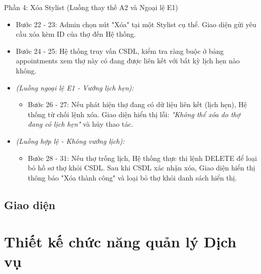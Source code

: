 \documentclass[../BTL.tex]{subfiles}
\begin{document}
Phần 4: Xóa Stylist (Luồng thay thế A2 và Ngoại lệ E1)

\begin{itemize}
\item
  Bước 22 - 23: Admin chọn nút "Xóa" tại một Stylist cụ thể. Giao diện
  gửi yêu cầu xóa kèm ID của thợ đến Hệ thống.
\item
  Bước 24 - 25: Hệ thống truy vấn CSDL, kiểm tra ràng buộc ở bảng
  appointments xem thợ này có đang được liên kết với bất kỳ lịch hẹn nào
  không.
\item
  \emph{(Luồng ngoại lệ E1 - Vướng lịch hẹn):}

  \begin{itemize}
  \item
    Bước 26 - 27: Nếu phát hiện thợ đang có dữ liệu liên kết (lịch hẹn),
    Hệ thống từ chối lệnh xóa. Giao diện hiển thị lỗi: \emph{"Không thể
    xóa do thợ đang có lịch hẹn"} và hủy thao tác.
  \end{itemize}
\item
  \emph{(Luồng hợp lệ - Không vướng lịch):}

  \begin{itemize}
  \item
    Bước 28 - 31: Nếu thợ trống lịch, Hệ thống thực thi lệnh DELETE để
    loại bỏ hồ sơ thợ khỏi CSDL. Sau khi CSDL xác nhận xóa, Giao diện
    hiển thị thông báo "Xóa thành công" và loại bỏ thợ khỏi danh sách
    hiển thị.
  \end{itemize}
\end{itemize}

\subsection{Giao diện}

\section{Thiết kế chức năng quản lý Dịch vụ}
\end{document}
